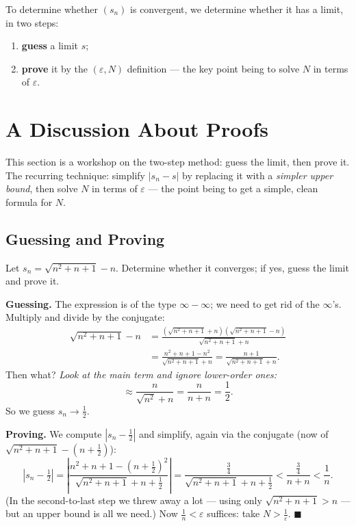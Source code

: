 \documentclass[11pt]{report}
\begin{document}
\begin{rembox}
To determine whether $(s_n)$ is convergent, we determine whether it has a limit, in two steps:
\begin{enumerate}[label=(\arabic*)]
    \item \textbf{guess} a limit $s$;
    \item \textbf{prove} it by the $(\varepsilon, N)$ definition --- the key point being to solve $N$ in terms of $\varepsilon$.
\end{enumerate}
\end{rembox}


\section{A Discussion About Proofs}

This section is a workshop on the two-step method: guess the limit, then prove it. The recurring technique: simplify $|s_n - s|$ by replacing it with a \emph{simpler upper bound}, then solve $N$ in terms of $\varepsilon$ --- the point being to get a simple, clean formula for $N$.

\subsection{Guessing and Proving}

\begin{exbox}
Let $s_n = \sqrt{n^2 + n + 1} - n$. Determine whether it converges; if yes, guess the limit and prove it.

\textbf{Guessing.} The expression is of the type $\infty - \infty$; we need to get rid of the $\infty$'s. Multiply and divide by the conjugate:
\begin{align*}
\sqrt{n^2+n+1} - n
&= \frac{(\sqrt{n^2+n+1} + n)(\sqrt{n^2+n+1} - n)}{\sqrt{n^2+n+1} + n}\\
&= \frac{n^2 + n + 1 - n^2}{\sqrt{n^2+n+1} + n}
= \frac{n+1}{\sqrt{n^2+n+1} + n}.
\end{align*}
Then what? \emph{Look at the main term and ignore lower-order ones:}
\[
\approx \frac{n}{\sqrt{n^2} + n} = \frac{n}{n + n} = \frac12.
\]
So we guess $s_n \to \tfrac12$.

\textbf{Proving.} We compute $|s_n - \tfrac12|$ and simplify, again via the conjugate (now of $\sqrt{n^2+n+1} - (n + \tfrac12)$):
\[
\left| s_n - \tfrac12 \right|
= \left| \frac{n^2+n+1 - (n+\tfrac12)^2}{\sqrt{n^2+n+1} + n + \tfrac12} \right|
= \frac{\tfrac34}{\sqrt{n^2+n+1} + n + \tfrac12}
< \frac{\tfrac34}{n + n}
< \frac1n.
\]
(In the second-to-last step we threw away a lot --- using only $\sqrt{n^2+n+1} > n$ --- but an upper bound is all we need.) Now $\tfrac1n < \varepsilon$ suffices: take $N > \tfrac1\varepsilon$. \hfill $\blacksquare$
\end{exbox}
\end{document}
